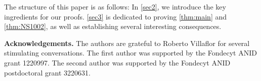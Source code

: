 \documentclass[11pt,leqno]{article}
\theoremstyle{definition}
\newtheorem{example}{Example}[section]
\begin{document}
The structure of this paper is as follows: In \cref{sec2}, we introduce the key ingredients for our proofs. \cref{sec3} is dedicated to proving \cref{thm:main} and \cref{thm:NS1002}, as well as establishing several interesting consequences.




\bigskip

\noindent\textbf{Acknowledgements.} The authors are grateful to Roberto Villaflor for several stimulating conversations. The first author was supported by the Fondecyt ANID grant 1220997. The second author was supported by the Fondecyt ANID postdoctoral grant 3220631.

\end{document}
